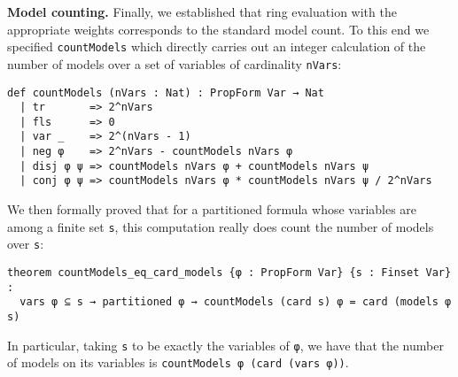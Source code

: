 \vspace{1em}\noindent
\textbf{Model counting.} Finally, we established that ring evaluation with the appropriate weights
corresponds to the standard model count. To this end we specified \lstinline{countModels}
which directly carries out an integer calculation of the number of models over a set of variables
of cardinality \lstinline{nVars}:
\begin{lstlisting}
def countModels (nVars : Nat) : PropForm Var → Nat
  | tr       => 2^nVars
  | fls      => 0
  | var _    => 2^(nVars - 1)
  | neg φ    => 2^nVars - countModels nVars φ
  | disj φ ψ => countModels nVars φ + countModels nVars ψ
  | conj φ ψ => countModels nVars φ * countModels nVars ψ / 2^nVars
\end{lstlisting}
We then formally proved that for a partitioned formula whose variables are among a finite set
\lstinline{s}, this computation really does count the number of models over \lstinline{s}:
\begin{lstlisting}
theorem countModels_eq_card_models {φ : PropForm Var} {s : Finset Var} :
  vars φ ⊆ s → partitioned φ → countModels (card s) φ = card (models φ s)
\end{lstlisting}
In particular, taking \lstinline{s} to be exactly the variables of \lstinline{φ},
we have that the number of models on its variables is \lstinline{countModels φ (card (vars φ))}.